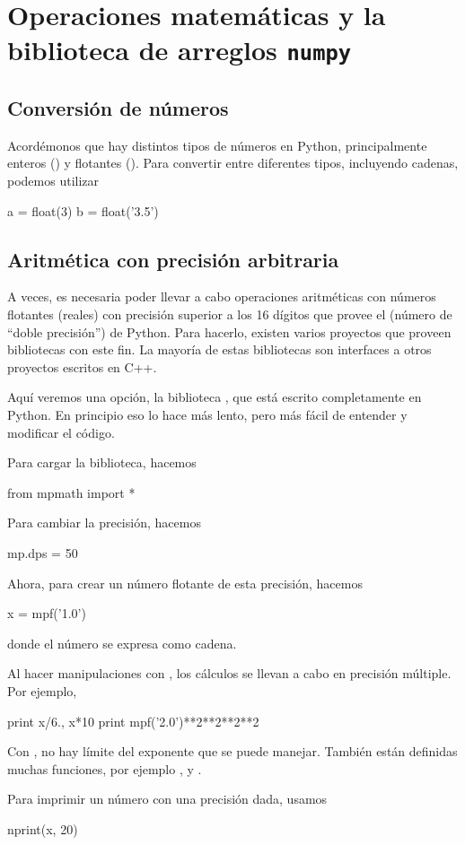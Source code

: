 \chapter{Operaciones matemáticas y la biblioteca de arreglos \texttt{numpy}}

\section{Conversión de números}
Acordémonos que hay distintos tipos de números en Python, principalmente enteros () y flotantes ().
Para convertir entre diferentes tipos, incluyendo cadenas, podemos utilizar
\begin{python}
a = float(3)
b = float('3.5')
\end{python}


\section{Aritmética con precisión arbitraria}

A veces, es necesaria poder llevar a cabo operaciones aritméticas con números flotantes (reales) con precisión superior a los 16 dígitos que provee el  (número de ``doble precisión'') de Python. Para hacerlo, existen varios proyectos que proveen bibliotecas con este fin.
La mayoría de estas bibliotecas son interfaces a otros proyectos escritos en C++.

Aquí veremos una opción, la biblioteca , que está escrito completamente en Python. En principio eso lo hace más lento, pero más fácil de entender y modificar el código.

Para cargar la biblioteca, hacemos
\begin{python}
from mpmath import *
\end{python}
Para cambiar la precisión, hacemos
\begin{python}
mp.dps = 50
\end{python}
Ahora, para crear un número flotante de esta precisión, hacemos
\begin{python}
x = mpf('1.0')
\end{python}
donde el número se expresa como cadena.

Al hacer manipulaciones con , los cálculos se llevan a cabo en precisión múltiple.
Por ejemplo,
\begin{python}
print x/6., x*10
print mpf('2.0')**2**2**2**2
\end{python}
Con , no hay límite del exponente que se puede manejar.
También están definidas muchas funciones, por ejemplo ,  y .

Para imprimir un número con una precisión dada, usamos
\begin{python}
nprint(x, 20)
\end{python}



